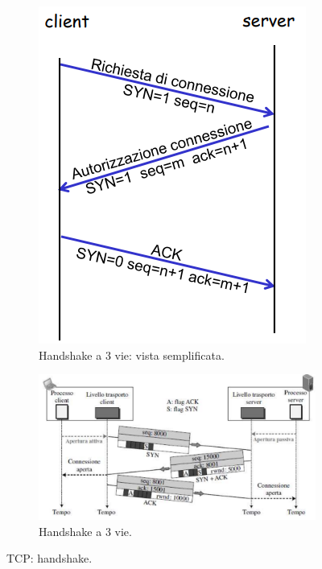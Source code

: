 \documentclass[11pt, italian, openany]{book}
\begin{document}
\begin{sloppypar}
\begin{figure}[!h]
	\begin{subfigure}[t]{0.35 \linewidth} \centering
		\includegraphics[scale=0.3]{images/tcp-3way-handshake-semplificato.png}
		\caption{Handshake a 3 vie: vista semplificata.}
	\end{subfigure}
	\begin{subfigure}[t]{0.64 \linewidth} \centering
		\includegraphics[scale=0.35]{images/tcp-3way-handshake.png}
		\caption{Handshake a 3 vie.}
	\end{subfigure}
	\caption{TCP: handshake.}
	\label{fig:tcp-handshake}
\end{figure}


\end{sloppypar}
\end{document}
